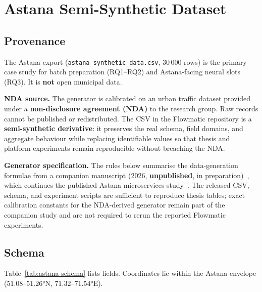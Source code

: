 \chapter{Astana Semi-Synthetic Dataset}
\label{app:astana}

\section{Provenance}

The Astana export (\texttt{astana\_synthetic\_data.csv}, 30\,000 rows) is the primary case study for batch preparation (RQ1--RQ2) and Astana-facing neural slots (RQ3). It is \textbf{not} open municipal data.

\textbf{NDA source.} The generator is calibrated on an urban traffic dataset provided under a \textbf{non-disclosure agreement (NDA)} to the research group. Raw records cannot be published or redistributed. The CSV in the Flowmatic repository is a \textbf{semi-synthetic derivative}: it preserves the real schema, field domains, and aggregate behaviour while replacing identifiable values so that thesis and platform experiments remain reproducible without breaching the NDA.

\textbf{Generator specification.} The rules below summarise the data-generation formulae from a companion manuscript (2026, \textbf{unpublished}, in preparation)~\cite{bakytuly2026architectural}, which continues the published Astana microservices study~\cite{bakytuly2026microservices}. The released CSV, schema, and experiment scripts are sufficient to reproduce thesis tables; exact calibration constants for the NDA-derived generator remain part of the companion study and are not required to rerun the reported Flowmatic experiments.

\section{Schema}

Table~\ref{tab:astana-schema} lists fields. Coordinates lie within the Astana envelope ($51.08$--$51.26$°N, $71.32$--$71.54$°E).

